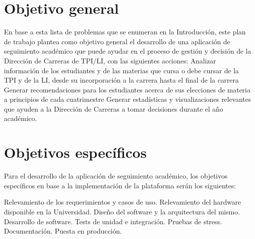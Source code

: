\section[Objetivo general]{Objetivo general}
En base a esta lista de problemas que se enumeran en la Introducción, este plan de trabajo plantea como objetivo general el desarrollo de una aplicación de seguimiento académico que puede ayudar en el proceso de gestión y decisión de la Dirección de Carreras de TPI/LI, con las siguientes acciones:
Analizar información de los estudiantes y de las materias que cursa o debe cursar de la TPI y de la LI, desde su incorporación a la carrera hasta el final de la carrera    
Generar recomendaciones para los estudiantes acerca de sus elecciones de materia a principios de cada cuatrimestre
Generar estadísticas y visualizaciones relevantes que ayuden a la Dirección de Carreras a tomar decisiones durante el año académico.

\section[Objetivos específicos]{Objetivos específicos}
Para el desarrollo de la aplicación de seguimiento académico, los objetivos específicos en base a la implementación de la plataforma serán los siguientes:

\begin{outline}
    \1 Relevamiento de los requerimientos y casos de uso.
    \1 Relevamiento del hardware disponible en la Universidad.
    \1 Diseño del software y la arquitectura del mismo.
    \1 Desarrollo de software.
    \1 Tests de unidad e integración.
    \1 Pruebas de stress.
    \1 Documentación.
    \1 Puesta en producción.
\end{outline}